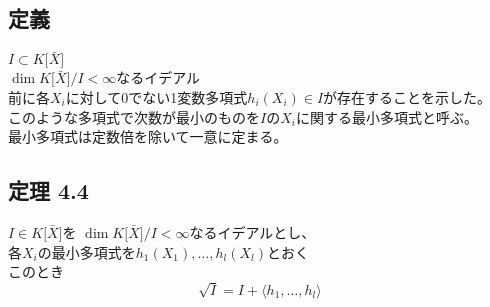\documentclass[12pt,a4paper]{article}
\begin{document}
\subsection*{定義}
  $I \subset K \lbrack \bar{X} \rbrack$ \\
  $\dim K\lbrack\bar{X}\rbrack / I < \infty$なるイデアル \\
  前に各$X_i$に対して$0$でない1変数多項式$h_i(X_i) \in I$が存在することを示した。 \\
  このような多項式で次数が最小のものを$I$の$X_i$に関する最小多項式と呼ぶ。\\
  最小多項式は定数倍を除いて一意に定まる。

\subsection*{定理 4.4}
  $I \in K \lbrack \bar{X} \rbrack$を $\dim K \lbrack \bar X \rbrack / I < \infty$なるイデアルとし、 \\
  各$X_i$の最小多項式を$h_1(X_1), \ldots , h_l (X_l)$とおく \\
  このとき
  \[ \sqrt{I} = I + \langle h_1, \ldots, h_l \rangle \]
\end{document}
